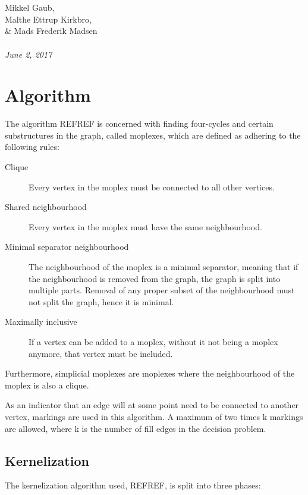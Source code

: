 \documentclass{article}
\begin{document}
\begin{titlepage}
		 \\ \\
		Mikkel Gaub, \\ Malthe Ettrup Kirkbro, \\ \& Mads Frederik Madsen	\\ \\
		\hspace{-18pt}
		\textit{June 2, 2017}
		\thispagestyle{empty}
	\end{titlepage}
	\clearpage

	\section{Algorithm}
	The algorithm REFREF is concerned with finding four-cycles and certain substructures in the graph, called moplexes, which are defined as adhering to the following rules: \\

	\begin{description}
		\item[Clique] Every vertex in the moplex must be connected to all other vertices.
		\item[Shared neighbourhood] Every vertex in the moplex must have the same neighbourhood.
		\item[Minimal separator neighbourhood] The neighbourhood of the moplex is a minimal separator, meaning that if the neighbourhood is removed from the graph, the graph is split into multiple parts. Removal of any proper subset of the neighbourhood must not split the graph, hence it is minimal.
		\item[Maximally inclusive] If a vertex can be added to a moplex, without it not being a moplex anymore, that vertex must be included.
	\end{description}

	Furthermore, simplicial moplexes are moplexes where the neighbourhood of the moplex is also a clique.

	As an indicator that an edge will at some point need to be connected to another vertex, markings are used in this algorithm. 
	A maximum of two times k markings are allowed, where k is the number of fill edges in the decision problem.

		\subsection{Kernelization}
		The kernelization algorithm used, REFREF, is split into three phases:
\end{document}

